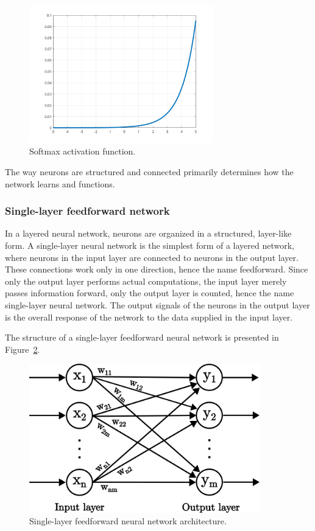 \documentclass[a4paper,oneside,onecolumn,12pt]{book}
\begin{document}
\begin{itemize}
		\begin{figure}[H]
		\begin{center}
			\includegraphics[keepaspectratio,width=8cm]{kep/softmax.png}
			\caption{Softmax activation function.}
			\label{fig:softmax}
		\end{center}
		\end{figure}
	\end{itemize}

	The way neurons are structured and connected primarily determines how the network learns and functions.

		\subsubsection{Single-layer feedforward network}
		In a layered neural network, neurons are organized in a structured, layer-like form. A single-layer neural network is the simplest form of a layered network, where neurons in the input layer are connected to neurons in the output layer. These connections work only in one direction, hence the name feedforward. Since only the output layer performs actual computations, the input layer merely passes information forward, only the output layer is counted, hence the name single-layer neural network. The output signals of the neurons in the output layer is the overall response of the network to the data supplied in the input layer. \cite{NNACF} 
		
		The structure of a single-layer feedforward neural network is presented in Figure~\ref{fig:single-layer feedforward nn}.
		\begin{figure}[H]
		\begin{center}
			\includegraphics[keepaspectratio,width=10cm]{kep/single_layer_feedforward_nn.png}
			\caption{Single-layer feedforward neural network architecture.}
			\label{fig:single-layer feedforward nn}
		\end{center}
		\end{figure}
\end{document}
